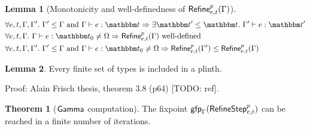 \documentclass[a4paper]{article}
\theoremstyle{definition}
\newtheorem{theorem}{Theorem}
\newtheorem{lemma}{Lemma}
\begin{document}
  \begin{lemma}[Monotonicity and well-definedness of $\textsf{Refine}^{p}_{e,t}(\Gamma)$]
    \begin{align*}
      &\forall e,t,\Gamma,\Gamma'.\ \Gamma'\leq\Gamma \text{ and } \Gamma \vdash e:\ts \Rightarrow \exists \ts'\leq \ts.\ \Gamma' \vdash e:\ts'\\
      &\forall e,t,\Gamma.\ \Gamma \vdash e:\ts_0 \neq \tsempty \Rightarrow \Refine p {e,t} \Gamma \text{ well-defined}\\
      &\forall e,t,\Gamma,\Gamma'.\ \Gamma'\leq\Gamma \text{ and } \Gamma \vdash e:\ts_0 \neq \tsempty \Rightarrow \Refine p {e,t} {\Gamma'} \leq \Refine p {e,t} \Gamma\\
    \end{align*}
  \end{lemma}

  \begin{lemma}
    Every finite set of types is included in a plinth.
  \end{lemma}
  Proof: Alain Frisch thesis, theorem 3.8 (p64) [TODO: ref].

  \begin{theorem}[$\textsf{Gamma}_{}$ computation]
    The fixpoint $\textsf{gfp}_\Gamma (\textsf{RefineStep}^{p}_{e,t})$ can be reached in a finite number of iterations.
  \end{theorem}
\end{document}

